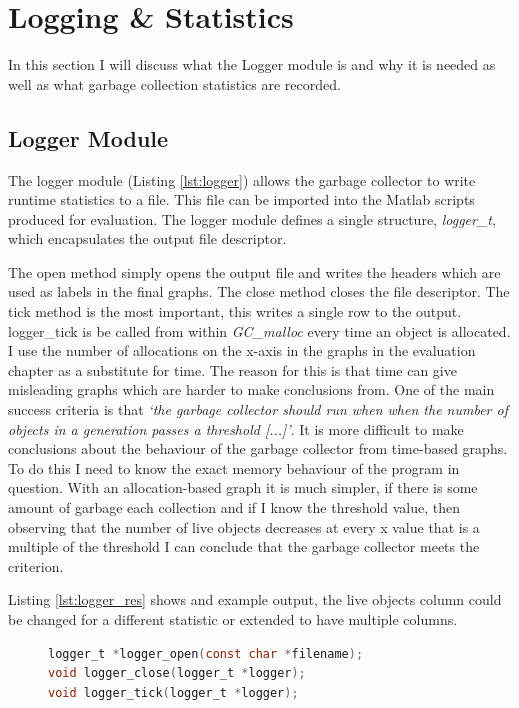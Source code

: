 \documentclass[../diss.tex]{subfiles}
\begin{document}
\section{Logging \& Statistics} \label{sec:logger}

In this section I will discuss what the Logger module is and why it is needed as well as what garbage collection statistics are recorded.

\subsection{Logger Module}

The logger module (Listing \ref{lst:logger}) allows the garbage collector to write runtime statistics to a file. This file can be imported into the Matlab scripts produced for evaluation. The logger module defines a single structure, \emph{logger\_t}, which encapsulates the output file descriptor.

The open method simply opens the output file and writes the headers which are used as labels in the final graphs. The close method closes the file descriptor. The tick method is the most important, this writes a single row to the output. logger\_tick is be called from within \emph{GC\_malloc} every time an object is allocated. 
I use the number of allocations on the x-axis in the graphs in the evaluation chapter as a substitute for time. The reason for this is that time can give misleading graphs which are harder to make conclusions from. One of the main success criteria is that \emph{`the garbage collector should run when when the number of objects in a generation passes a threshold [...]'}. It is more difficult to make conclusions about the behaviour of the garbage collector from time-based graphs. To do this I need to know the exact memory behaviour of the program in question. With an allocation-based graph it is much simpler, if there is some amount of garbage each collection and if I know the threshold value, then observing that the number of live objects decreases at every x value that is a multiple of the threshold I can conclude that the garbage collector meets the criterion. 

Listing \ref{lst:logger_res} shows and example output, the live objects column could be changed for a different statistic or extended to have multiple columns.

\begin{figure}
\begin{lstlisting}[language=C, caption=Logger interface, label={lst:logger}]
logger_t *logger_open(const char *filename);
void logger_close(logger_t *logger);
void logger_tick(logger_t *logger);
\end{lstlisting}
\end{figure}
\end{document}
